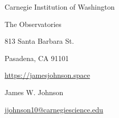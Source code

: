 \documentclass[cv.tex]{subfiles}
\begin{document}
\begin{center}
\parbox{.40\textwidth}{%
	\raggedleft%
	\vspace{-1.5cm}%
	Carnegie Institution of Washington \par
	The Observatories \par
	813 Santa Barbara St. \par
	Pasadena, CA 91101 \par
	\url{https://jamesjohnson.space}%
}%
\hspace{4mm}%
\vrule height 2.0cm width 0.4pt%
\hspace{4mm}%
\parbox{.54\textwidth}{%
	{%
	\vspace{-1.5cm}%
	\fontsize{30}{36} \selectfont James W. Johnson \par
	\fontsize{20}{25} \selectfont {} \par
	\fontsize{11}{13} \selectfont%
	\vspace{0.08cm}%
	\href{mailto:jjohnson10@carnegiescience.edu}{jjohnson10@carnegiescience.edu}%
	\hspace{3mm}%
	}%
}%
\end{center}
\end{document}
